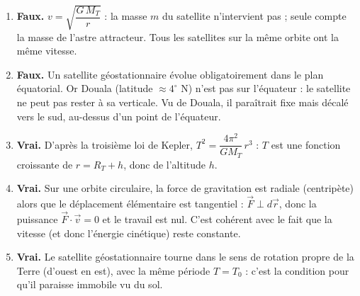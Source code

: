 \documentclass[11pt]{article}
\begin{document}
\begin{corrige}
\begin{enumerate}
\item \textbf{Faux.} $v = \sqrt{\dfrac{G\,M_T}{r}}$ : la masse $m$ du satellite n'intervient pas ; seule compte la masse de l'astre attracteur. Tous les satellites sur la même orbite ont la même vitesse.
\item \textbf{Faux.} Un satellite géostationnaire évolue obligatoirement dans le plan équatorial. Or Douala (latitude $\approx 4^{\circ}$ N) n'est pas sur l'équateur : le satellite ne peut pas rester à sa verticale. Vu de Douala, il paraîtrait fixe mais décalé vers le sud, au-dessus d'un point de l'équateur.
\item \textbf{Vrai.} D'après la troisième loi de Kepler, $T^2 = \dfrac{4\pi^2}{GM_T}\,r^3$ : $T$ est une fonction croissante de $r = R_T + h$, donc de l'altitude $h$.
\item \textbf{Vrai.} Sur une orbite circulaire, la force de gravitation est radiale (centripète) alors que le déplacement élémentaire est tangentiel : $\vec{F} \perp d\vec{r}$, donc la puissance $\vec{F}\cdot\vec{v} = 0$ et le travail est nul. C'est cohérent avec le fait que la vitesse (et donc l'énergie cinétique) reste constante.
\item \textbf{Vrai.} Le satellite géostationnaire tourne dans le sens de rotation propre de la Terre (d'ouest en est), avec la même période $T = T_0$ : c'est la condition pour qu'il paraisse immobile vu du sol.
\end{enumerate}
\end{corrige}
\end{document}
